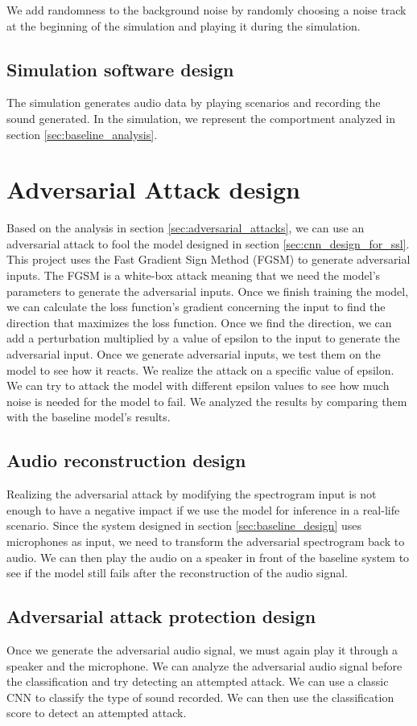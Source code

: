 We add randomness to the background noise by randomly choosing a noise track at the beginning of the simulation and playing it during the simulation.

\subsection{Simulation software design}

The simulation generates audio data by playing scenarios and recording the sound generated. In the simulation, we represent the comportment analyzed in section \ref{sec:baseline_analysis}.

\section{Adversarial Attack design}
\label{sec:adversarial_attack_design}

Based on the analysis in section \ref{sec:adversarial_attacks}, we can use an adversarial attack to fool the model designed in section \ref{sec:cnn_design_for_ssl}. This project uses the Fast Gradient Sign Method (FGSM) to generate adversarial inputs. The FGSM is a white-box attack meaning that we need the model's parameters to generate the adversarial inputs. Once we finish training the model, we can calculate the loss function's gradient concerning the input to find the direction that maximizes the loss function. Once we find the direction, we can add a perturbation multiplied by a value of epsilon to the input to generate the adversarial input. 
Once we generate adversarial inputs, we test them on the model to see how it reacts. We realize the attack on a specific value of epsilon. We can try to attack the model with different epsilon values to see how much noise is needed for the model to fail. We analyzed the results by comparing them with the baseline model's results.

\subsection{Audio reconstruction design}

Realizing the adversarial attack by modifying the spectrogram input is not enough to have a negative impact if we use the model for inference in a real-life scenario. Since the system designed in section \ref{sec:baseline_design} uses microphones as input, we need to transform the adversarial spectrogram back to audio. We can then play the audio on a speaker in front of the baseline system to see if the model still fails after the reconstruction of the audio signal.

\subsection{Adversarial attack protection design}

Once we generate the adversarial audio signal, we must again play it through a speaker and the microphone. We can analyze the adversarial audio signal before the classification and try detecting an attempted attack. We can use a classic CNN to classify the type of sound recorded. We can then use the classification score to detect an attempted attack.